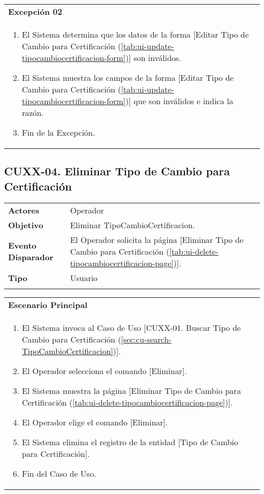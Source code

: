 \begin{tabular}{ p{15.5cm} }
	\textbf{Excepción 02} \\
	\begin{enumerate}
		\item El Sistema determina que los datos de la forma [Editar Tipo de Cambio para Certificación (\ref{tab:ui-update-tipocambiocertificacion-form})] son inválidos.
		\item El Sistema muestra los campos de la forma [Editar Tipo de Cambio para Certificación (\ref{tab:ui-update-tipocambiocertificacion-form})] que son inválidos e indica la razón.
		\item Fin de la Excepción.
	\end{enumerate}
\end{tabular}


\clearpage
\subsection{CUXX-04. Eliminar Tipo de Cambio para Certificación} \label{sec:cu-delete-TipoCambioCertificacion}

\begin{tabular}{ p{3.5cm} p{11.5cm} }
	\textbf{Actores} & Operador\\
	\textbf{Objetivo} & Eliminar TipoCambioCertificacion.\\
	\textbf{Evento Disparador} & El Operador solicita la página [Eliminar Tipo de Cambio para Certificación (\ref{tab:ui-delete-tipocambiocertificacion-page})].\\
	\textbf{Tipo} & Usuario\\
	\\
\end{tabular}

\begin{tabular}{ p{15.5cm} }
	\textbf{Escenario Principal} \\
	\begin{enumerate}
		\item El Sistema invoca al Caso de Uso [CUXX-01. Buscar Tipo de Cambio para Certificación (\ref{sec:cu-search-TipoCambioCertificacion})].
		\item El Operador selecciona el comando [Eliminar].
		\item El Sistema muestra la página [Eliminar Tipo de Cambio para Certificación (\ref{tab:ui-delete-tipocambiocertificacion-page})].
		\item El Operador elige el comando [Eliminar].
		\item El Sistema elimina el registro de la entidad [Tipo de Cambio para Certificación].
		\item Fin del Caso de Uso.
	\end{enumerate}
\end{tabular}

